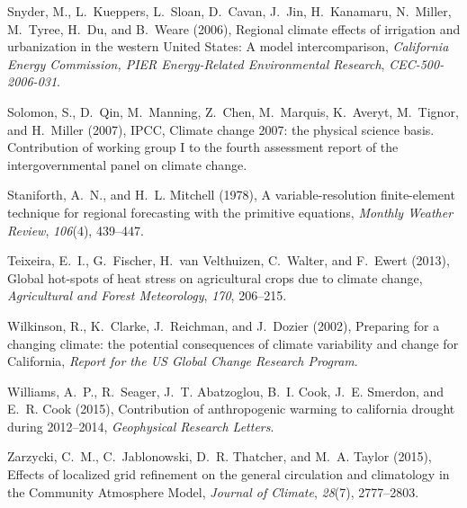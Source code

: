 \documentclass[draft,ms]{agutex}   %
\begin{document}
\begin{article}
\begin{thebibliography}{43}
Snyder, M., L.~Kueppers, L.~Sloan, D.~Cavan, J.~Jin, H.~Kanamaru, N.~Miller,
  M.~Tyree, H.~Du, and B.~Weare (2006), {Regional climate effects of irrigation
  and urbanization in the western United States: A model intercomparison},
  \textit{California Energy Commission, PIER Energy-Related Environmental
  Research}, \textit{CEC-500-2006-031}.

Solomon, S., D.~Qin, M.~Manning, Z.~Chen, M.~Marquis, K.~Averyt, M.~Tignor, and
  H.~Miller (2007), {IPCC, Climate change 2007: the physical science basis.
  Contribution of working group I to the fourth assessment report of the
  intergovernmental panel on climate change}.

Staniforth, A.~N., and H.~L. Mitchell (1978), A variable-resolution
  finite-element technique for regional forecasting with the primitive
  equations, \textit{Monthly Weather Review}, \textit{106}(4), 439--447.

Teixeira, E.~I., G.~Fischer, H.~van Velthuizen, C.~Walter, and F.~Ewert (2013),
  Global hot-spots of heat stress on agricultural crops due to climate change,
  \textit{Agricultural and Forest Meteorology}, \textit{170}, 206--215.

Wilkinson, R., K.~Clarke, J.~Reichman, and J.~Dozier (2002), {Preparing for a
  changing climate: the potential consequences of climate variability and
  change for California}, \textit{Report for the US Global Change Research
  Program}.

Williams, A.~P., R.~Seager, J.~T. Abatzoglou, B.~I. Cook, J.~E. Smerdon, and
  E.~R. Cook (2015), Contribution of anthropogenic warming to california
  drought during 2012--2014, \textit{Geophysical Research Letters}.

Zarzycki, C.~M., C.~Jablonowski, D.~R. Thatcher, and M.~A. Taylor (2015),
  {Effects of localized grid refinement on the general circulation and
  climatology in the Community Atmosphere Model}, \textit{Journal of Climate},
  \textit{28}(7), 2777--2803.

\end{thebibliography}


\end{article}
\end{document}

